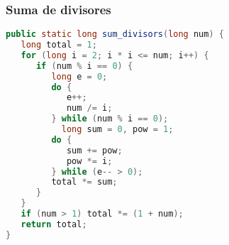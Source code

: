 \subsubsection{Suma de divisores}
\begin{lstlisting}[language=Java]
public static long sum_divisors(long num) {
   long total = 1;
   for (long i = 2; i * i <= num; i++) {
      if (num % i == 0) {
         long e = 0;
         do {
            e++;
            num /= i;
         } while (num % i == 0);
           long sum = 0, pow = 1;
         do {
            sum += pow;
            pow *= i;
         } while (e-- > 0);
         total *= sum;
      }
   }
   if (num > 1) total *= (1 + num);
   return total;
}
\end{lstlisting}
